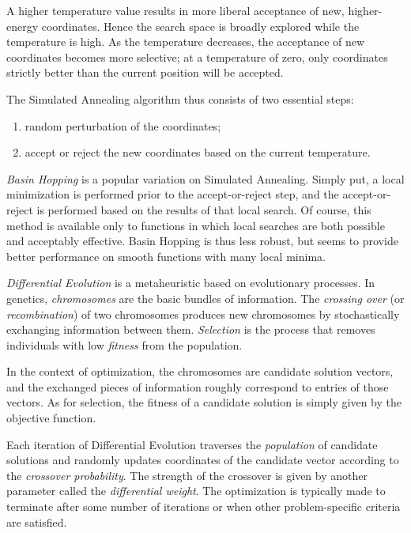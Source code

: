 \documentclass[12pt]{article}
\begin{document}
A higher temperature value results in more liberal acceptance of new,
higher-energy coordinates.
Hence the search space is broadly explored while the temperature is high.
As the temperature decreases, the acceptance of new coordinates becomes
more selective; at a temperature of zero, only coordinates strictly better
than the current position will be accepted.

The Simulated Annealing algorithm thus consists of two essential steps:
\begin{enumerate}
    \item random perturbation of the coordinates;
    \item accept or reject the new coordinates based on the current
        temperature.
\end{enumerate}

\emph{Basin Hopping}\cite{wales1997} is a popular variation on Simulated
Annealing.
Simply put, a local minimization is performed prior to the accept-or-reject
step, and the accept-or-reject is performed based on the results of that
local search.
Of course, this method is available only to functions in which local
searches are both possible and acceptably effective.
Basin Hopping is thus less robust, but seems to provide better performance
on smooth functions with many local minima.

\emph{Differential Evolution}\cite{storn1997} is a metaheuristic based on
evolutionary processes.
In genetics, \emph{chromosomes} are the basic bundles of information.
The \emph{crossing over} (or \emph{recombination}) of two chromosomes produces
new chromosomes by stochastically exchanging information between them.
\emph{Selection} is the process that removes individuals with low
\emph{fitness} from the population.

In the context of optimization, the chromosomes are candidate solution
vectors, and the exchanged pieces of information roughly correspond to
entries of those vectors. As for selection, the fitness of a candidate solution
is simply given by the objective function.

Each iteration of Differential Evolution traverses the \emph{population} of
candidate solutions and randomly updates coordinates of the candidate vector
according to the \emph{crossover probability}. The strength of the crossover is
given by another parameter called the \emph{differential weight}. The
optimization is typically made to terminate after some number of iterations or
when other problem-specific criteria are satisfied.
\end{document}

